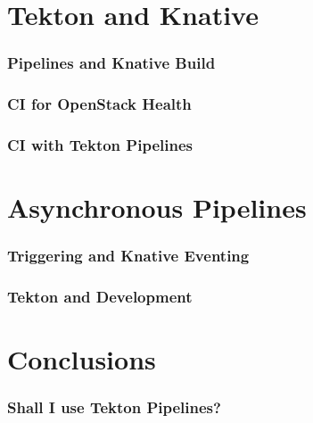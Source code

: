 \documentclass[aspectratio=169,11pt,hyperref={colorlinks=true}]{beamer}
\begin{document}
\begin{lblackrwhiteframe}
\begin{blackframe}
\section{Tekton and Knative}

\begin{grayframe}
  \frametitle{Pipelines and Knative Build}
\end{grayframe}

\begin{grayframe}
  \frametitle{CI for OpenStack Health}
\end{grayframe}

\begin{grayframe}
  \frametitle{CI with Tekton Pipelines}
\end{grayframe}

\section{Asynchronous Pipelines}

\begin{grayframe}
  \frametitle{Triggering and Knative Eventing}
\end{grayframe}

\begin{grayframe}
  \frametitle{Tekton and Development}
\end{grayframe}

\section{Conclusions}

\begin{grayframe}
  \frametitle{Shall I use Tekton Pipelines?}
\end{grayframe}


\end{blackframe}
\end{lblackrwhiteframe}
\end{document}
